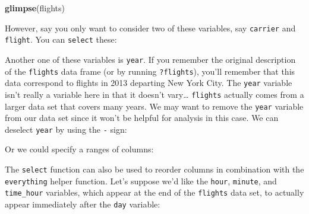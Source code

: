 \documentclass[]{tufte-book}
\newenvironment{Shaded}{\begin{snugshade}}{\end{snugshade}}
\newcommand{\KeywordTok}[1]{\textcolor[rgb]{0.13,0.29,0.53}{\textbf{{#1}}}}
\newcommand{\StringTok}[1]{\textcolor[rgb]{0.31,0.60,0.02}{{#1}}}
\newcommand{\NormalTok}[1]{{#1}}
\theoremstyle{definition}
\theoremstyle{definition}
\theoremstyle{remark}
\begin{document}
\begin{Shaded}
\begin{Highlighting}[]
\KeywordTok{glimpse}\NormalTok{(flights)}
\end{Highlighting}
\end{Shaded}

However, say you only want to consider two of these variables, say
\texttt{carrier} and \texttt{flight}. You can \texttt{select} these:

\begin{Shaded}
\end{Shaded}

Another one of these variables is \texttt{year}. If you remember the
original description of the \texttt{flights} data frame (or by running
\texttt{?flights}), you'll remember that this data correspond to flights
in 2013 departing New York City. The \texttt{year} variable isn't really
a variable here in that it doesn't vary\ldots{} \texttt{flights}
actually comes from a larger data set that covers many years. We may
want to remove the \texttt{year} variable from our data set since it
won't be helpful for analysis in this case. We can deselect
\texttt{year} by using the \texttt{-} sign:

\begin{Shaded}
\end{Shaded}

Or we could specify a ranges of columns:

\begin{Shaded}
\end{Shaded}

The \texttt{select} function can also be used to reorder columns in
combination with the \texttt{everything} helper function. Let's suppose
we'd like the \texttt{hour}, \texttt{minute}, and \texttt{time\_hour}
variables, which appear at the end of the \texttt{flights} data set, to
actually appear immediately after the \texttt{day} variable:
\end{document}

